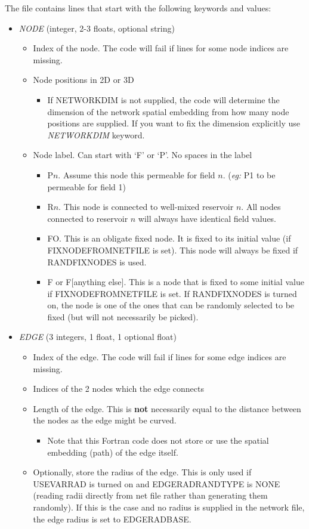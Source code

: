 \documentclass[12pt]{article}
\begin{document}
The file contains lines that start with the following keywords and values:
\begin{itemize}
	\item {\it NODE} (integer, 2-3 floats, optional string)
	\begin{itemize}
		\item Index of the node. {\color{red} The code will fail if lines for some node indices are missing.}
		\item Node positions in 2D or 3D
		\begin{itemize}
			\item If NETWORKDIM is not supplied, the code will determine the dimension of the network spatial embedding from how many node positions are supplied. If you want to fix the dimension explicitly use {\it NETWORKDIM} keyword.
		\end{itemize}
		\item Node label. Can start with `F' or `P'. No spaces in the label
		\begin{itemize}
			\item P$n$. Assume this node this permeable for field $n$. ({\em eg:} P1 to be permeable for field 1)
			\item R$n$. This node is connected to well-mixed reservoir $n$. All nodes connected to reservoir $n$ will always have identical field values.
			\item FO. This is an obligate fixed node. It is fixed to its initial value (if FIXNODEFROMNETFILE is set). This node will always be fixed if RANDFIXNODES is used.
			\item F or F[anything else]. This is a node that is fixed to some initial value if FIXNODEFROMNETFILE is set. If RANDFIXNODES is turned on, the node is one of the ones that can be randomly selected to be fixed (but will not necessarily be picked).
		\end{itemize}
	\end{itemize}
	\item {\it EDGE} (3 integers, 1 float, 1 optional float)
	\begin{itemize}
		\item Index of the edge. {\color{red} The code will fail if lines for some edge indices are missing.}
		\item Indices of the 2 nodes which the edge connects
		\item Length of the edge. This is {\bf not} necessarily equal to the distance between the nodes as the edge might be curved. 
		\begin{itemize}
			\item Note that this Fortran code does not store or use the spatial embedding (path) of the edge itself. 
		\end{itemize}
		\item Optionally, store the radius of the edge. This is only used if USEVARRAD is turned on and EDGERADRANDTYPE is NONE (reading radii directly from net file rather than generating them randomly). If this is the case and no radius is supplied in the network file, the edge radius is set to EDGERADBASE.
	\end{itemize}
\end{itemize}
\end{document}
